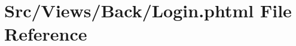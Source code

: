 \hypertarget{_login_8phtml}{}\section{Src/\+Views/\+Back/\+Login.phtml File Reference}
\label{_login_8phtml}
